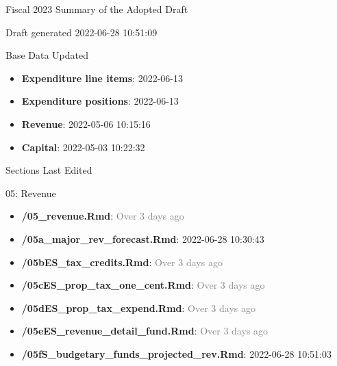 \thispagestyle{empty}
          \begin{center}

          {\Large Fiscal 2023 Summary of the Adopted Draft}

          {\large Draft generated 2022-06-28 10:51:09}

          \end{center}

          {\large Base Data Updated}

          \begin{scriptsize}

            \begin{itemize}
              \item \textbf{Expenditure line items}: 2022-06-13
              \item \textbf{Expenditure positions}: 2022-06-13
            \end{itemize}

          \vfill\null
          \columnbreak

            \begin{itemize}
              \item \textbf{Revenue}: 2022-05-06 10:15:16
              \item \textbf{Capital}: 2022-05-03 10:22:32
            \end{itemize}

          \end{scriptsize}

          {\large Sections Last Edited}

          \begin{scriptsize}{\small 05: Revenue}\begin{itemize}
                  \item 
\textbf{/05\_revenue.Rmd}: \textcolor{gray}{Over 3 days ago}
 \item \textbf{/05a\_major\_rev\_forecast.Rmd}: 2022-06-28 10:30:43
 \item \textbf{/05bES\_tax\_credits.Rmd}: \textcolor{gray}{Over 3 days ago}
 \item \textbf{/05cES\_prop\_tax\_one\_cent.Rmd}: \textcolor{gray}{Over 3 days ago}
 \item \textbf{/05dES\_prop\_tax\_expend.Rmd}: \textcolor{gray}{Over 3 days ago}
 \item \textbf{/05eES\_revenue\_detail\_fund.Rmd}: \textcolor{gray}{Over 3 days ago}
 \item \textbf{/05fS\_budgetary\_funds\_projected\_rev.Rmd}: 2022-06-28 10:51:03
 \end{itemize}\end{scriptsize}
